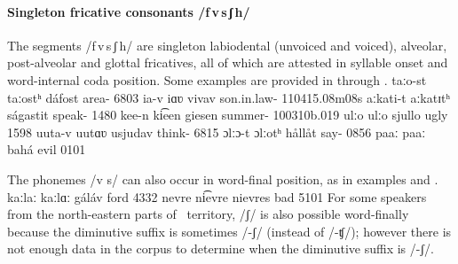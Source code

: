 \paragraph{Singleton fricative consonants /f\,v\,s\,ʃ\,h/}\label{fvssjh}
The segments \mbox{/f\,v\,s\,ʃ\,h/} are singleton labiodental (unvoiced and voiced), alveolar, post-alveolar and glottal fricatives, all of which are attested in syllable onset and word-internal coda position. %
Some examples are provided in  through .
	{taːo-st}		{taːostʰ}		{dáfost}	{area-}		{6803}
	{ia-v}	{iɑʋ}		{vivav}	{son.in.law-}	{110415}{.08m08s}
		{aːkati-t}	{aːkatɪtʰ}	{ságastit}	{speak-}		{1480}
	{kee-n}		{ki͡een}		{giesen}	{summer-}	{100310b}{.019}
			{ulːo}			{ulːo}			{sjullo}	{ugly\Sc{}}		{1598}
	{uuta-v}		{uutɑʋ}		{usjudav}	{think-}		{6815}
			{\Bf{h}ɔlːɔ-t}		{ɔlːotʰ}		{hållåt}	{say-}	{0856}
		{paaː}		{paaː}		{bahá}	{evil\BS{}}	{0101}

The phonemes /v s/ can also occur in word-final position, as in examples  and .%
	{kaːlaː}	{kaːlɑː}	{gáláv}	{ford\BS{}}	{4332}
		{nevre}	{ni͡evre}	{nievres}	{bad\Sc{}}	{5101}
For some speakers from the north-eastern parts of \PS\ territory, /ʃ/ is also possible word-finally because the diminutive suffix is sometimes /-ʃ/ (instead of /-ʧ/); however there is not enough data in the corpus to determine when the diminutive suffix is /-ʃ/. 

